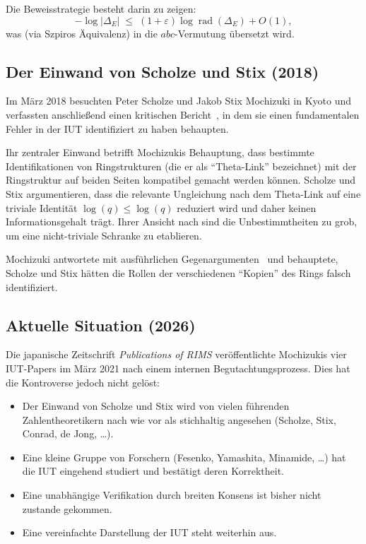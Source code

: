 \documentclass[12pt,a4paper]{article}
\theoremstyle{remark}
\begin{document}
Die Beweisstrategie besteht darin zu zeigen:
\[
  -\log|\Delta_E| \;\leq\; (1+\varepsilon)\log\operatorname{rad}(\Delta_E) + O(1),
\]
was (via Szpiros Äquivalenz) in die $abc$-Vermutung übersetzt wird.

\subsection{Der Einwand von Scholze und Stix (2018)}

Im März 2018 besuchten Peter Scholze und Jakob Stix Mochizuki in Kyoto und verfassten
anschließend einen kritischen Bericht~\cite{ScholzeStix2018}, in dem sie einen
fundamentalen Fehler in der IUT identifiziert zu haben behaupten.

Ihr zentraler Einwand betrifft Mochizukis Behauptung, dass bestimmte Identifikationen
von Ringstrukturen (die er als ``Theta-Link'' bezeichnet) mit der Ringstruktur auf beiden
Seiten kompatibel gemacht werden können. Scholze und Stix argumentieren, dass die
relevante Ungleichung nach dem Theta-Link auf eine triviale Identität $\log(q) \leq \log(q)$
reduziert wird und daher keinen Informationsgehalt trägt. Ihrer Ansicht nach sind die
Unbestimmtheiten zu grob, um eine nicht-triviale Schranke zu etablieren.

Mochizuki antwortete mit ausführlichen Gegenargumenten~\cite{Mochizuki2018rebuttal} und
behauptete, Scholze und Stix hätten die Rollen der verschiedenen ``Kopien'' des Rings
falsch identifiziert.

\subsection{Aktuelle Situation (2026)}

Die japanische Zeitschrift \textit{Publications of RIMS} veröffentlichte Mochizukis vier
IUT-Papers im März 2021 nach einem internen Begutachtungsprozess. Dies hat die Kontroverse
jedoch nicht gelöst:
\begin{itemize}[nosep]
  \item Der Einwand von Scholze und Stix wird von vielen führenden Zahlentheoretikern
    nach wie vor als stichhaltig angesehen (Scholze, Stix, Conrad, de Jong, \ldots).
  \item Eine kleine Gruppe von Forschern (Fesenko, Yamashita, Minamide, \ldots) hat die
    IUT eingehend studiert und bestätigt deren Korrektheit.
  \item Eine unabhängige Verifikation durch breiten Konsens ist bisher nicht zustande
    gekommen.
  \item Eine vereinfachte Darstellung der IUT steht weiterhin aus.
\end{itemize}
\end{document}
